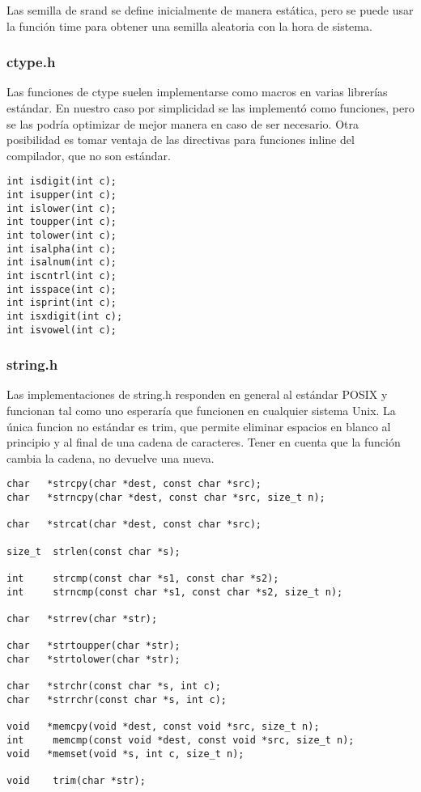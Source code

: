 \documentclass[11pt]{article}
\begin{document}
Las semilla de srand se define inicialmente de manera estática, pero se puede usar la función time para obtener una semilla aleatoria con la hora de sistema.

\subsubsection{ctype.h}

Las funciones de ctype suelen implementarse como macros en varias librerías estándar. En nuestro caso por simplicidad se las implementó como funciones, pero se las podría optimizar de mejor manera en caso de ser necesario. Otra posibilidad es tomar ventaja de las directivas para funciones inline del compilador, que no son estándar.

\begin{lstlisting}
int isdigit(int c);
int isupper(int c);
int islower(int c);
int toupper(int c);
int tolower(int c);
int isalpha(int c);
int isalnum(int c);
int iscntrl(int c);
int isspace(int c);
int isprint(int c);
int isxdigit(int c);
int isvowel(int c);
\end{lstlisting}

\subsubsection{string.h}

Las implementaciones de string.h responden en general al estándar POSIX y funcionan tal como uno esperaría que funcionen en cualquier sistema Unix. La única funcion no estándar es trim, que permite eliminar espacios en blanco al principio y al final de una cadena de caracteres. Tener en cuenta que la función cambia la cadena, no devuelve una nueva.

\begin{lstlisting}
char   *strcpy(char *dest, const char *src);
char   *strncpy(char *dest, const char *src, size_t n);

char   *strcat(char *dest, const char *src);

size_t  strlen(const char *s);

int     strcmp(const char *s1, const char *s2);
int     strncmp(const char *s1, const char *s2, size_t n);

char   *strrev(char *str);

char   *strtoupper(char *str);
char   *strtolower(char *str);

char   *strchr(const char *s, int c);
char   *strrchr(const char *s, int c);

void   *memcpy(void *dest, const void *src, size_t n);
int     memcmp(const void *dest, const void *src, size_t n);
void   *memset(void *s, int c, size_t n);

void    trim(char *str);
\end{lstlisting}
\end{document}
